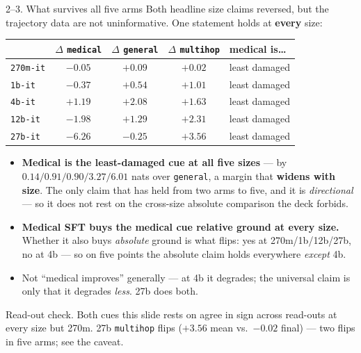 \documentclass[aspectratio=169,10pt]{beamer}
\newcommand{\good}[1]{\textcolor{up}{#1}}
\newcommand{\bad}[1]{\textcolor{down}{#1}}
\begin{document}
\begin{frame}{2--3. What survives all five arms}
  \small
  Both headline size claims reversed, but the trajectory data are not
  uninformative. One statement holds at \textbf{every} size:

  \vspace{0.7em}
  \centering
  \begin{tabular}{lcccl}
    \toprule
    & $\Delta$ \texttt{medical} & $\Delta$ \texttt{general} & $\Delta$ \texttt{multihop} & medical is\ldots \\
    \midrule
    \texttt{270m-it} & \good{$-0.05$} & \bad{$+0.09$} & \bad{$+0.02$} & least damaged \\
    \texttt{1b-it}   & \good{$-0.37$} & \bad{$+0.54$} & \bad{$+1.01$} & least damaged \\
    \texttt{4b-it}   & \bad{$+1.19$}  & \bad{$+2.08$} & \bad{$+1.63$} & least damaged \\
    \texttt{12b-it}  & \good{$-1.98$} & \bad{$+1.29$} & \bad{$+2.31$} & least damaged \\
    \texttt{27b-it}  & \good{$-6.26$} & \good{$-0.25$} & \bad{$+3.56$} & least damaged \\
    \bottomrule
  \end{tabular}

  \vspace{0.6em}
  {\footnotesize
  \begin{itemize}\setlength{\itemsep}{0.2em}
    \item \good{\textbf{Medical is the least-damaged cue at all five sizes}}
      --- by $0.14 / 0.91 / 0.90 / 3.27 / \mathbf{6.01}$ nats over \texttt{general},
      a margin that \textbf{widens with size}. The only claim that has held from
      two arms to five, and it is \emph{directional} --- so it does not rest on
      the cross-size absolute comparison the deck forbids.
    \item \textbf{Medical SFT buys the medical cue relative ground at every
      size.} Whether it also buys \emph{absolute} ground is what flips: yes at
      270m/1b/12b/27b, no at 4b --- so on five points the absolute claim holds
      everywhere \emph{except} 4b.
    \item \bad{Not ``medical improves'' generally} --- at 4b it degrades; the
      universal claim is only that it degrades \emph{less}. \good{27b does both.}
  \end{itemize}}
  \vfill
  {\scriptsize \good{Read-out check.} Both cues this slide rests on agree in sign
  across read-outs at every size but 270m. \bad{27b \texttt{multihop} flips}
  ($+3.56$ mean vs.\ $-0.02$ final) --- two flips in five arms; see the caveat.}
\end{frame}
\end{document}

